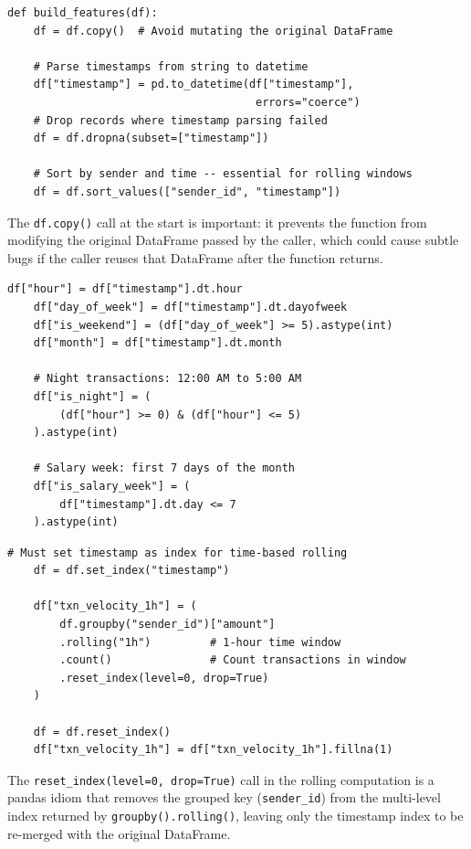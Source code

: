 \begin{lstlisting}[caption={Stage 1 -- Data cleaning and timestamp parsing}, label={lst:stage1}]
def build_features(df):
    df = df.copy()  # Avoid mutating the original DataFrame

    # Parse timestamps from string to datetime
    df["timestamp"] = pd.to_datetime(df["timestamp"],
                                      errors="coerce")
    # Drop records where timestamp parsing failed
    df = df.dropna(subset=["timestamp"])

    # Sort by sender and time -- essential for rolling windows
    df = df.sort_values(["sender_id", "timestamp"])
\end{lstlisting}

The \texttt{df.copy()} call at the start is important: it prevents the function from modifying the original DataFrame passed by the caller, which could cause subtle bugs if the caller reuses that DataFrame after the function returns.

\begin{lstlisting}[caption={Stage 2 -- Temporal feature extraction}, label={lst:stage2}]
    df["hour"] = df["timestamp"].dt.hour
    df["day_of_week"] = df["timestamp"].dt.dayofweek
    df["is_weekend"] = (df["day_of_week"] >= 5).astype(int)
    df["month"] = df["timestamp"].dt.month

    # Night transactions: 12:00 AM to 5:00 AM
    df["is_night"] = (
        (df["hour"] >= 0) & (df["hour"] <= 5)
    ).astype(int)

    # Salary week: first 7 days of the month
    df["is_salary_week"] = (
        df["timestamp"].dt.day <= 7
    ).astype(int)
\end{lstlisting}

\begin{lstlisting}[caption={Stage 3 -- Transaction velocity with rolling window}, label={lst:stage3}]
    # Must set timestamp as index for time-based rolling
    df = df.set_index("timestamp")

    df["txn_velocity_1h"] = (
        df.groupby("sender_id")["amount"]
        .rolling("1h")         # 1-hour time window
        .count()               # Count transactions in window
        .reset_index(level=0, drop=True)
    )

    df = df.reset_index()
    df["txn_velocity_1h"] = df["txn_velocity_1h"].fillna(1)
\end{lstlisting}

The \texttt{reset\_index(level=0, drop=True)} call in the rolling computation is a pandas idiom that removes the grouped key (\texttt{sender\_id}) from the multi-level index returned by \texttt{groupby().rolling()}, leaving only the timestamp index to be re-merged with the original DataFrame.


